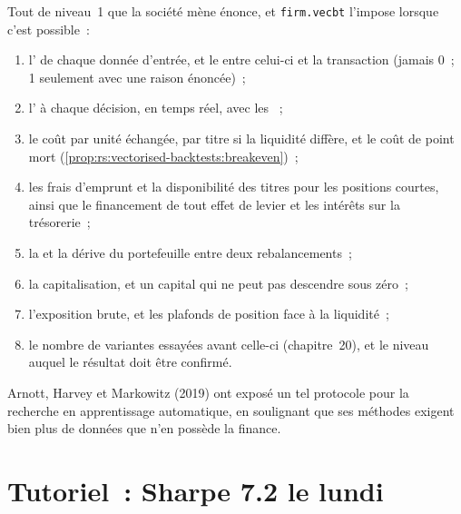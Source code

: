 Tout  de niveau~1 que la société mène énonce, et \texttt{firm.vecbt} l'impose lorsque c'est possible~:
\begin{enumerate}
\item l' de chaque donnée d'entrée, et le  entre celui-ci et la transaction (jamais 0~; 1 seulement avec une raison énoncée)~;
\item l' à chaque décision, en temps réel, avec les ~;
\item le coût par unité échangée, par titre si la liquidité diffère, et le coût de point mort (\cref{prop:rs:vectorised-backtests:breakeven})~;
\item les frais d'emprunt et la disponibilité des titres pour les positions courtes, ainsi que le financement de tout effet de levier et les intérêts sur la trésorerie~;
\item la  et la dérive du portefeuille entre deux rebalancements~;
\item la capitalisation, et un capital qui ne peut pas descendre sous zéro~;
\item l'exposition brute, et les plafonds de position face à la liquidité~;
\item le nombre de variantes essayées avant celle-ci (chapitre~20), et le niveau auquel le résultat doit être confirmé.
\end{enumerate}
Arnott, Harvey et Markowitz (2019) ont exposé un tel protocole pour la recherche en apprentissage automatique, en soulignant que ses méthodes exigent bien plus de données
que n'en possède la finance.

\section{Tutoriel~: Sharpe 7.2 le lundi}\label{tut:rs:vectorised-backtests:tut}

